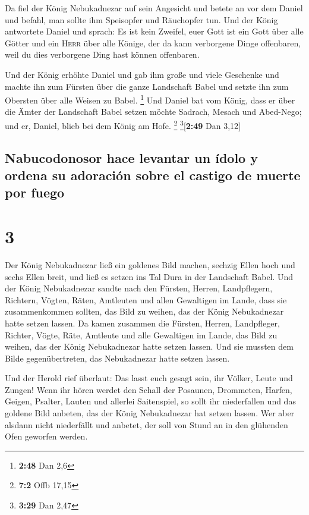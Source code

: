  Da fiel der König Nebukadnezar auf sein Angesicht und
betete an vor dem Daniel und befahl, man sollte ihm Speisopfer und
Räuchopfer tun.  Und der König antwortete Daniel und
sprach: Es ist kein Zweifel, euer Gott ist ein Gott über alle Götter und
ein \textsc{Herr} über alle Könige, der da kann verborgene Dinge
offenbaren, weil du dies verborgene Ding hast können offenbaren.

 Und der König erhöhte Daniel und gab ihm große und viele
Geschenke und machte ihn zum Fürsten über die ganze Landschaft Babel und
setzte ihn zum Obersten über alle Weisen zu Babel. \footnote{\textbf{2:48}
  Dan 2,6}  Und Daniel bat vom König, dass er über die
Ämter der Landschaft Babel setzen möchte Sadrach, Mesach und Abed-Nego;
und er, Daniel, blieb bei dem König am Hofe. \footnote{\textbf{7:2} Offb
  17,15} \footnote{\textbf{3:29} Dan 2,47}{[}\textbf{2:49} Dan 3,12{]}

\hypertarget{nabucodonosor-hace-levantar-un-uxeddolo-y-ordena-su-adoraciuxf3n-sobre-el-castigo-de-muerte-por-fuego}{%
\subsection{Nabucodonosor hace levantar un ídolo y ordena su adoración
sobre el castigo de muerte por
fuego}\label{nabucodonosor-hace-levantar-un-uxeddolo-y-ordena-su-adoraciuxf3n-sobre-el-castigo-de-muerte-por-fuego}}

\hypertarget{section-2}{%
\section{3}\label{section-2}}

 Der König Nebukadnezar ließ ein goldenes Bild machen,
sechzig Ellen hoch und sechs Ellen breit, und ließ es setzen ins Tal
Dura in der Landschaft Babel.  Und der König Nebukadnezar
sandte nach den Fürsten, Herren, Landpflegern, Richtern, Vögten, Räten,
Amtleuten und allen Gewaltigen im Lande, dass sie zusammenkommen
sollten, das Bild zu weihen, das der König Nebukadnezar hatte setzen
lassen.  Da kamen zusammen die Fürsten, Herren,
Landpfleger, Richter, Vögte, Räte, Amtleute und alle Gewaltigen im
Lande, das Bild zu weihen, das der König Nebukadnezar hatte setzen
lassen. Und sie mussten dem Bilde gegenübertreten, das Nebukadnezar
hatte setzen lassen.

 Und der Herold rief überlaut: Das lasst euch gesagt sein,
ihr Völker, Leute und Zungen!  Wenn ihr hören werdet den
Schall der Posaunen, Drommeten, Harfen, Geigen, Psalter, Lauten und
allerlei Saitenspiel, so sollt ihr niederfallen und das goldene Bild
anbeten, das der König Nebukadnezar hat setzen lassen. 
Wer aber alsdann nicht niederfällt und anbetet, der soll von Stund an in
den glühenden Ofen geworfen werden.

